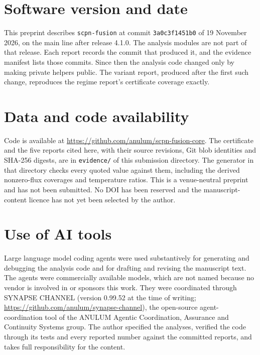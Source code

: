 \documentclass[11pt]{article}
\begin{document}
\section*{Software version and date}

This preprint describes \texttt{scpn-fusion} at commit \texttt{3a0c3f1451b0}
of 19 November 2026, on the main line after release 4.1.0.  The analysis
modules are not part of that release.  Each report records the commit that
produced it, and the evidence manifest lists those commits.  Since then the
analysis code changed only by making private helpers public.  The variant
report, produced after the first such change, reproduces the regime report's
certificate coverage exactly.

\section*{Data and code availability}

Code is available at \url{https://github.com/anulum/scpn-fusion-core}.  The
certificate and the five reports cited here, with their source revisions, Git
blob identities and SHA-256 digests, are in \texttt{evidence/} of this
submission directory.  The generator in that directory checks every quoted
value against them, including the derived nonzero-flux coverages and
temperature ratios.  This is a
venue-neutral preprint and has not been submitted.  No DOI has been reserved
and the manuscript-content licence has not yet been selected by the author.

\section*{Use of AI tools}

Large language model coding agents were used substantively for generating and
debugging the analysis code and for drafting and revising the manuscript text.
The agents were commercially available models, which are not named because no
vendor is involved in or sponsors this work.  They were coordinated through
SYNAPSE CHANNEL (version 0.99.52 at the time of writing;
\url{https://github.com/anulum/synapse-channel}), the open-source
agent-coordination tool of the ANULUM Agentic Coordination, Assurance and
Continuity Systems group.  The author specified the analyses, verified the
code through its tests and every reported number against the committed
reports, and takes full responsibility for the content.


\end{document}
